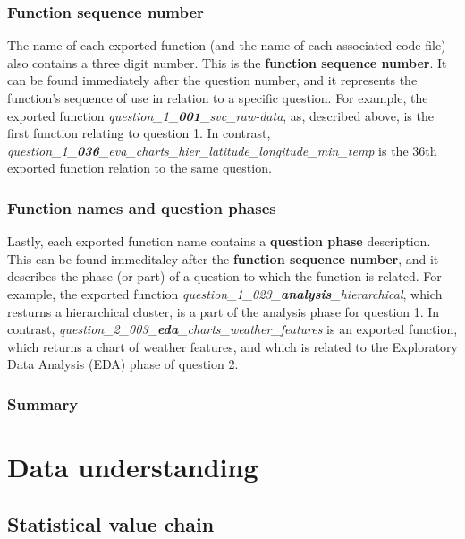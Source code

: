 \documentclass[12pt, oneside, openany]{book}
\begin{document}
\subsubsection*{Function sequence number}
The name of each exported function (and the name of each associated code file) also contains a three digit number. This is the \textbf{function sequence number}. It can be found immediately after the question number, and it represents the function's sequence of use in relation to a specific question. For example, the exported function \emph{question\_1\_\textbf{001}\_svc\_raw-data}, as, described above, is the first function relating to question 1. In contrast, \emph{question\_1\_\textbf{036}\_eva\_charts\_hier\_latitude\_longitude\_min\_temp} is the 36th exported function relation to the same question.

\subsubsection*{Function names and question phases}
Lastly, each exported function name contains a \textbf{question phase} description. This can be found immeditaley after the \textbf{function sequence number}, and it describes the phase (or part) of a question to which the function is related. For example, the exported function \emph{question\_1\_023\_\textbf{analysis}\_hierarchical}, which resturns a hierarchical cluster, is a part of the analysis phase for question 1. In contrast, \emph{question\_2\_003\_\textbf{eda}\_charts\_weather\_features} is an exported function, which returns a chart of weather features, and which is related to the Exploratory Data Analysis (EDA) phase of question 2.

\subsubsection*{Summary}

\section*{Data understanding}

\subsection*{Statistical value chain}
\end{document}

